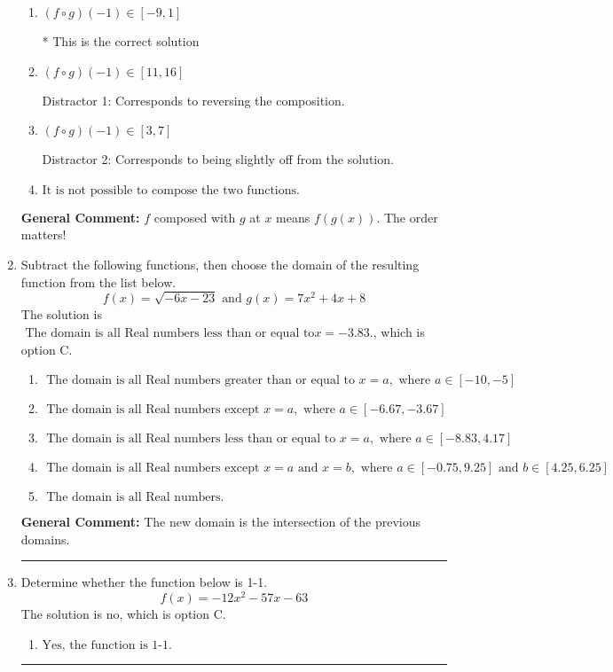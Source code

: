 \documentclass{extbook}[14pt]
\newcommand{\litem}[1]{\item #1

\rule{\textwidth}{0.4pt}}
\begin{document}
\begin{enumerate}
{\begin{enumerate}[label=\Alph*.]
 Distractor 3: Corresponds to being slightly off from the solution.
\item \( (f \circ g)(-1) \in [-9, 1] \)

* This is the correct solution
\item \( (f \circ g)(-1) \in [11, 16] \)

 Distractor 1: Corresponds to reversing the composition.
\item \( (f \circ g)(-1) \in [3, 7] \)

 Distractor 2: Corresponds to being slightly off from the solution.
\item \( \text{It is not possible to compose the two functions.} \)


\end{enumerate}

\textbf{General Comment:} $f$ composed with $g$ at $x$ means $f(g(x))$. The order matters!
}
\litem{
Subtract the following functions, then choose the domain of the resulting function from the list below.
\[ f(x) = \sqrt{-6x-23}  \text{ and } g(x) = 7x^{2} +4 x + 8 \]The solution is \( \text{ The domain is all Real numbers less than or equal to} x = -3.83. \), which is option C.\begin{enumerate}[label=\Alph*.]
\item \( \text{ The domain is all Real numbers greater than or equal to } x = a, \text{ where } a \in [-10, -5] \)


\item \( \text{ The domain is all Real numbers except } x = a, \text{ where } a \in [-6.67, -3.67] \)


\item \( \text{ The domain is all Real numbers less than or equal to } x = a, \text{ where } a \in [-8.83, 4.17] \)


\item \( \text{ The domain is all Real numbers except } x = a \text{ and } x = b, \text{ where } a \in [-0.75, 9.25] \text{ and } b \in [4.25, 6.25] \)


\item \( \text{ The domain is all Real numbers. } \)


\end{enumerate}

\textbf{General Comment:} The new domain is the intersection of the previous domains.
}
\litem{
Determine whether the function below is 1-1.
\[ f(x) = -12 x^2 - 57 x - 63 \]The solution is \( \text{no} \), which is option C.\begin{enumerate}[label=\Alph*.]
\item \( \text{Yes, the function is 1-1.} \)


\end{enumerate}}
\end{enumerate}
\end{document}
